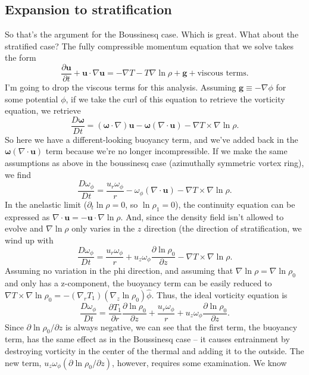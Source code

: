 \documentclass[onecolumn, amsmath, amsfonts, amssymb]{aastex62}
\newcommand{\grad}{\ensuremath{\nabla}}
\begin{document}
\subsection{Expansion to stratification}
So that's the argument for the Boussinesq case. Which is great. What about the stratified
case?  The fully compressible momentum equation that we solve takes the form
$$
\frac{\partial\bm{u}}{\partial t} + \bm{u}\cdot\grad\bm{u} =
- \grad T - T \grad\ln\rho + \bm{g} + \text{viscous terms}.
$$
I'm going to drop the viscous terms for this analysis. Assuming $\bm{g} \equiv -\grad\phi$
for some potential $\phi$, if we take the curl of this equation to retrieve the vorticity equation,
we retrieve
$$
\frac{D\bm{\omega}}{D t} = %
(\bm{\omega}\cdot\grad)\bm{u} - \bm{\omega}(\grad\cdot\bm{u}) - \grad T \times \grad\ln\rho.
$$
So here we have a different-looking buoyancy term, and we've added back in the
$\bm{\omega}(\grad\cdot\bm{u})$ term because we're no longer incompressible. If we make the
same assumptions as above in the boussinesq case (azimuthally symmetric vortex ring), we find
$$
\frac{D\omega_\phi}{D t} = 
\frac{u_r\omega_\phi}{r} - \omega_\phi(\grad\cdot\bm{u}) - \grad T \times \grad\ln\rho.
$$
In the anelastic limit ($\partial_t \ln\rho = 0$, so $\ln{\rho_1} = 0$), the continuity
equation can be expressed as $\grad\cdot\bm{u} = -\bm{u}\cdot\grad\ln\rho$. And, since the
density field isn't allowed to evolve and $\grad\ln\rho$ only varies in the $z$ direction
(the direction of stratification, we wind up with
$$
\frac{D\omega_\phi}{D t} = 
\frac{u_r\omega_\phi}{r} + u_z\omega_\phi\frac{\partial \ln\rho_0}{\partial z} - \grad T \times \grad\ln\rho.
$$
Assuming no variation in the phi direction, and assuming that $\grad\ln\rho = \grad\ln\rho_0$
and only has a z-component, the buoyancy term can be easily reduced to
$\grad T \times \grad\ln\rho_0 = -(\grad_r T_1)(\grad_z\ln\rho_0)\hat{\phi}$. Thus, the
ideal vorticity equation is
\begin{equation}
\frac{D \omega_\phi}{D t} = \frac{\partial T_1}{\partial r}\frac{\partial\ln\rho_0}{\partial z}
+ \frac{u_r\omega_\phi}{r} + u_z \omega_\phi \frac{\partial\ln\rho_0}{\partial z}.
\end{equation}
Since $\partial\ln\rho_0/\partial z$ is always negative, we can see that the first term, the
buoyancy term, has the same effect as in the Boussinesq case -- it causes entrainment by
destroying vorticity in the center of the thermal and adding it to the outside. The new term,
$u_z \omega_\phi (\partial\ln\rho_0/\partial z)$, however, requires some examination. We know
\end{document}
